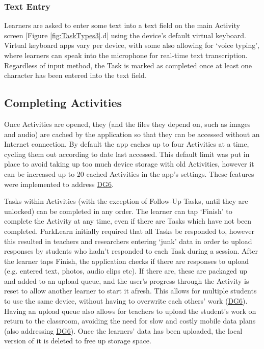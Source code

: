 \subsubsection*{Text Entry}
Learners are asked to enter some text into a text field on the main Activity screen [Figure \ref{fig:TaskTypes3}.d] using the device's default virtual keyboard. Virtual keyboard apps vary per device, with some also allowing for `voice typing', where learners can speak into the microphone for real-time text transcription. Regardless of input method, the Task is marked as completed once at least one character has been entered into the text field. 

\subsection{Completing Activities}

Once Activities are opened, they (and the files they depend on, such as images and audio) are cached by the application so that they can be accessed without an Internet connection. By default the app caches up to four Activities at a time, cycling them out according to date last accessed. This default limit was put in place to avoid taking up too much device storage with old Activities, however it can be increased up to 20 cached Activities in the app's settings. These features were implemented to address \hyperref[DG6]{DG6}.

Tasks within Activities (with the exception of Follow-Up Tasks, until they are unlocked) can be completed in any order. The learner can tap `Finish' to complete the Activity at any time, even if there are Tasks which have not been completed. ParkLearn initially required that all Tasks be responded to, however this resulted in teachers and researchers entering `junk' data in order to upload responses by students who hadn't responded to each Task during a session. After the learner taps Finish, the application checks if there are responses to upload (e.g. entered text, photos, audio clips etc). If there are, these are packaged up and added to an upload queue, and the user's progress through the Activity is reset to allow another learner to start it afresh. This allows for multiple students to use the same device, without having to overwrite each others' work (\hyperref[DG6]{DG6}). Having an upload queue also allows for teachers to upload the student's work on return to the classroom, avoiding the need for slow and costly mobile data plans (also addressing \hyperref[DG6]{DG6}). Once the learners' data has been uploaded, the local version of it is deleted to free up storage space.

